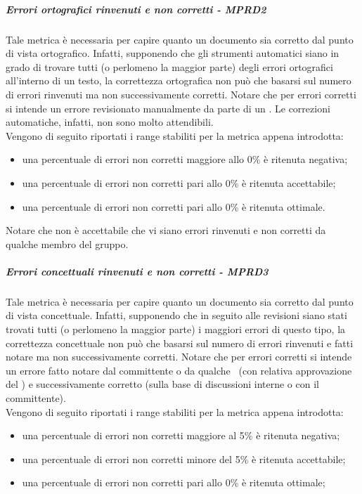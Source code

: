 \documentclass[../PianoDiQualifica.tex]{subfiles}
\begin{document}
				\subparagraph{Errori ortografici rinvenuti e non corretti - MPRD2}\label{MPRD2}
				Tale metrica è necessaria per capire quanto un documento sia corretto dal punto di vista ortografico. Infatti, supponendo che gli strumenti automatici siano in grado di trovare tutti (o perlomeno la maggior parte) degli errori ortografici all'interno di un testo, la correttezza ortografica non può che basarsi sul numero di errori rinvenuti ma non successivamente corretti. Notare che per errori corretti si intende un errore revisionato manualmente da parte di un \verificatore. Le correzioni automatiche, infatti, non sono molto attendibili. \\
				Vengono di seguito riportati i range stabiliti per la metrica appena introdotta:
				\begin{itemize}
					\item una percentuale di errori non corretti maggiore allo 0\% è ritenuta negativa;
					\item una percentuale di errori non corretti pari allo 0\% è ritenuta accettabile;
					\item una percentuale di errori non corretti pari allo 0\% è ritenuta ottimale.
				\end{itemize}
				Notare che non è accettabile che vi siano errori rinvenuti e non corretti da qualche membro del gruppo.
				\subparagraph{Errori concettuali rinvenuti e non corretti - MPRD3}\label{MPRD3}
				Tale metrica è necessaria per capire quanto un documento sia corretto dal punto di vista concettuale. Infatti, supponendo che in seguito alle revisioni siano stati trovati tutti (o perlomeno la maggior parte) i maggiori errori di questo tipo, la correttezza concettuale non può che basarsi sul numero di errori rinvenuti e fatti notare ma non successivamente corretti. Notare che per errori corretti si intende un errore fatto notare dal committente o da qualche \verificatore\ (con relativa approvazione del \responsabilediprogetto) e successivamente corretto (sulla base di discussioni interne o con il committente).\\
				Vengono di seguito riportati i range stabiliti per la metrica appena introdotta:
				\begin{itemize}
					\item una percentuale di errori non corretti maggiore al 5\% è ritenuta negativa;
					\item una percentuale di errori non corretti minore del 5\% è ritenuta accettabile;
					\item una percentuale di errori non corretti pari allo 0\% è ritenuta ottimale;
				\end{itemize}	
\end{document}
